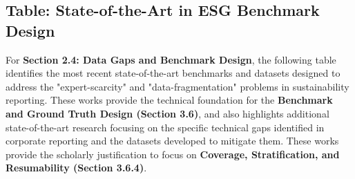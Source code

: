\documentclass[english, online, cse, master]{dithesis}
\begin{document}
\subsection{Table: State-of-the-Art in ESG Benchmark Design}

For \textbf{Section 2.4: Data Gaps and Benchmark Design}, the following table identifies the most recent state-of-the-art benchmarks and datasets designed to address the "expert-scarcity" and "data-fragmentation" problems in sustainability reporting. These works provide the technical foundation for the \textbf{Benchmark and Ground Truth Design (Section 3.6)}, and also highlights additional state-of-the-art research focusing on the specific technical gaps identified in corporate reporting and the datasets developed to mitigate them. These works provide the scholarly justification to focus on \textbf{Coverage, Stratification, and Resumability (Section 3.6.4)}.
\end{document}
